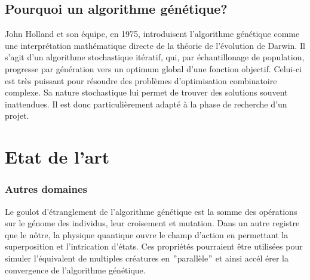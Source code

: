 \documentclass[journal, a4paper]{IEEEtran}
\begin{document}
	\subsection{Pourquoi un algorithme génétique?}\label{subsec:pourquoi-un-algorithme-genetique?}
	John Holland et son équipe, en 1975, introduisent
	l'algorithme génétique\cite{systems-adaptation} comme une
	interprétation mathématique directe de la théorie de l'évolution de
	Darwin.
	Il s'agit d'un algorithme stochastique itératif, qui, par
	échantillonage de population, progresse par génération
	vers	un optimum global d’une fonction objectif.
	Celui-ci est très puissant pour résoudre des problèmes
	d'optimisation combinatoire complexe.
	Sa nature stochastique lui permet de trouver des solutions souvent
	inattendues. Il est donc particulièrement adapté à la phase de
	recherche d'un projet.


\section{Etat de l'art}\label{sec:etat-de-l'art}

\subsubsection{Autres domaines}
	Le goulot d'étranglement de l'algorithme génétique est la somme
	des opérations sur le génome des individus, leur croisement et
	mutation.
	Dans un autre registre que le nôtre, la physique quantique ouvre le
	champ d'action en permettant la superposition et
	l'intrication
	d'états.
	Ces propriétés pourraient être utilisées pour simuler
	l'équivalent de multiples créatures en \("\)parallèle\("\) et ainsi accél
	érer la convergence
	de l'algorithme génétique.\cite{quantum-computing}
\end{document}

